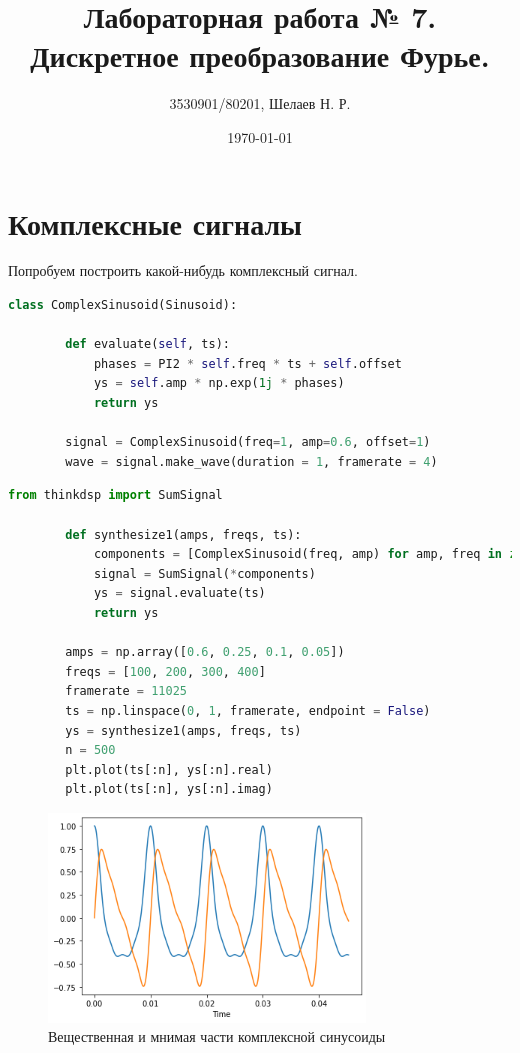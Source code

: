 \documentclass[a4paper, 12pt]{report}
\author{3530901/80201, Шелаев Н. Р.}
\title{Лабораторная работа № 7. Дискретное преобразование Фурье.}
\date{\today}
\begin{document}
	\maketitle
	\tableofcontents
	\listoffigures
	\lstlistoflistings

	\chapter{Комплексные сигналы}
	Попробуем построить какой-нибудь комплексный сигнал.
	\begin{lstlisting}[language=Python,caption=Строим комплексную синусоиду]
		class ComplexSinusoid(Sinusoid):
    
		def evaluate(self, ts):
			phases = PI2 * self.freq * ts + self.offset
			ys = self.amp * np.exp(1j * phases)
			return ys

		signal = ComplexSinusoid(freq=1, amp=0.6, offset=1)
		wave = signal.make_wave(duration = 1, framerate = 4)
	\end{lstlisting}
	\begin{lstlisting}[language=Python,caption=Исследуем полученный сигнал]
		from thinkdsp import SumSignal

		def synthesize1(amps, freqs, ts):
			components = [ComplexSinusoid(freq, amp) for amp, freq in zip(amps, freqs)]
			signal = SumSignal(*components)
			ys = signal.evaluate(ts)
			return ys
		
		amps = np.array([0.6, 0.25, 0.1, 0.05])
		freqs = [100, 200, 300, 400]
		framerate = 11025
		ts = np.linspace(0, 1, framerate, endpoint = False)
		ys = synthesize1(amps, freqs, ts)
		n = 500
		plt.plot(ts[:n], ys[:n].real)
		plt.plot(ts[:n], ys[:n].imag)
	\end{lstlisting}
	\begin{figure}[H]
		\centering
		\includegraphics[width=0.75\textwidth]{task1.png}
		\caption{Вещественная и мнимая части комплексной синусоиды}
		\label{fig:task1}
	\end{figure}
\end{document}
